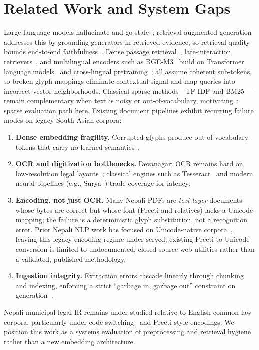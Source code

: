 \documentclass[journal]{IEEEtran}
\begin{document}
\section{Related Work and System Gaps}
Large language models hallucinate and go stale~\cite{ji2023hallucination}; retrieval-augmented generation~\cite{lewis2020rag} addresses this by grounding generators in retrieved evidence, so retrieval quality bounds end-to-end faithfulness~\cite{gao2023ragsurvey}. Dense passage retrieval~\cite{karpukhin2020dpr}, late-interaction retrievers~\cite{khattab2020colbert}, and multilingual encoders such as BGE-M3~\cite{chen2024bge} build on Transformer language models~\cite{vaswani2017attention,devlin2019bert} and cross-lingual pretraining~\cite{conneau2020xlmr,feng2022labse}; all assume coherent sub-tokens, so broken glyph mappings eliminate contextual signal and map queries into incorrect vector neighborhoods. Classical sparse methods---TF-IDF and BM25~\cite{salton1983ir,robertson2009bm25,manning2008ir}---remain complementary when text is noisy or out-of-vocabulary, motivating a sparse evaluation path here. Existing document pipelines exhibit recurring failure modes on legacy South Asian corpora:
\begin{enumerate}
  \item \textbf{Dense embedding fragility.} Corrupted glyphs produce out-of-vocabulary tokens that carry no learned semantics~\cite{chen2024bge,reimers2019sbert}.
  \item \textbf{OCR and digitization bottlenecks.} Devanagari OCR remains hard on low-resolution legal layouts~\cite{jayadevan2011devanagari}; classical engines such as Tesseract~\cite{smith2007tesseract} and modern neural pipelines (e.g., Surya~\cite{surya2024}) trade coverage for latency.
  \item \textbf{Encoding, not just OCR.} Many Nepali PDFs are \emph{text-layer} documents whose bytes are correct but whose font (Preeti and relatives) lacks a Unicode mapping; the failure is a deterministic glyph substitution, not a recognition error. Prior Nepali NLP work has focused on Unicode-native corpora~\cite{nepberta2022,pudasaini2023nepalibert}, leaving this legacy-encoding regime under-served; existing Preeti-to-Unicode conversion is limited to undocumented, closed-source web utilities rather than a validated, published methodology.
  \item \textbf{Ingestion integrity.} Extraction errors cascade linearly through chunking and indexing, enforcing a strict ``garbage in, garbage out'' constraint on generation~\cite{langchain}.
\end{enumerate}
Nepali municipal legal IR remains under-studied relative to English common-law corpora, particularly under code-switching~\cite{sitaram2019codeswitch} and Preeti-style encodings. We position this work as a systems evaluation of preprocessing and retrieval hygiene rather than a new embedding architecture.
\end{document}
